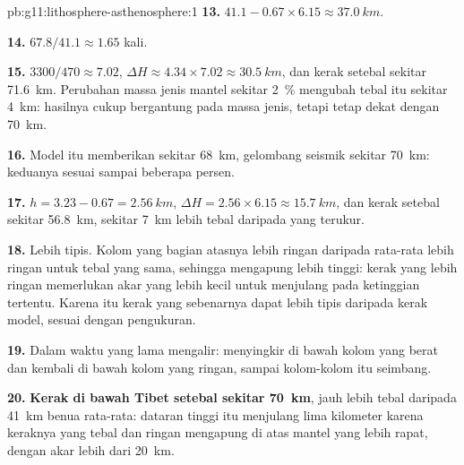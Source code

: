 \begin{solution}{pb:g11:lithosphere-asthenosphere:1}
\textbf{13.} $41.1 - 0.67 \times 6.15 \approx \qty{37.0}{km}$.

\textbf{14.} $67.8/41.1 \approx 1.65$ kali.

\textbf{15.} $3300/470 \approx 7.02$, $\Delta H \approx 4.34 \times 7.02
\approx \qty{30.5}{km}$, dan kerak setebal sekitar \qty{71.6}{km}. Perubahan
massa jenis mantel sekitar \qty{2}{\percent} mengubah tebal itu sekitar
\qty{4}{km}: hasilnya cukup bergantung pada massa jenis, tetapi tetap dekat
dengan \qty{70}{km}.

\textbf{16.} Model itu memberikan sekitar \qty{68}{km}, gelombang seismik sekitar
\qty{70}{km}: keduanya sesuai sampai beberapa persen.

\textbf{17.} $h = 3.23 - 0.67 = \qty{2.56}{km}$, $\Delta H = 2.56 \times
6.15 \approx \qty{15.7}{km}$, dan kerak setebal sekitar \qty{56.8}{km}, sekitar
\qty{7}{km} lebih tebal daripada yang terukur.

\textbf{18.} Lebih tipis. Kolom yang bagian atasnya lebih ringan daripada
rata-rata lebih ringan untuk tebal yang sama, sehingga mengapung lebih tinggi:
kerak yang lebih ringan memerlukan akar yang lebih kecil untuk menjulang pada
ketinggian tertentu. Karena itu kerak yang sebenarnya dapat lebih tipis daripada
kerak model, sesuai dengan pengukuran.

\textbf{19.} Dalam waktu yang lama  mengalir:  menyingkir di
bawah kolom yang berat dan kembali di bawah kolom yang ringan, sampai kolom-kolom
itu seimbang.

\textbf{20.} \textbf{Kerak di bawah Tibet setebal sekitar \qty{70}{km}}, jauh
lebih tebal daripada \qty{41}{km} benua rata-rata: dataran tinggi itu menjulang
lima kilometer karena keraknya yang tebal dan ringan mengapung di atas mantel
yang lebih rapat, dengan akar lebih dari \qty{20}{km}.
\end{solution}
